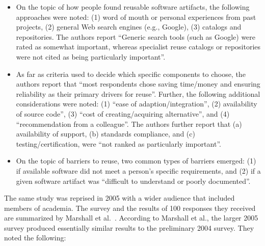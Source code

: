 \documentclass{casicswhitepaper}
\begin{document}
\begin{itemize}

\item On the topic of how people found reusable software artifacts, the following approaches were noted: (1) word of mouth or personal experiences from past projects, (2) general Web search engines (e.g., Google), (3) catalogs and repositories.  The authors report ``Generic search tools (such as Google) were rated as somewhat important, whereas specialist reuse catalogs or repositories were not cited as being particularly important''.

\item As far as criteria used to decide which specific components to choose, the authors report that ``most respondents chose saving time/money and ensuring reliability as their primary drivers for reuse''.  Further, the following additional considerations were noted: (1) ``ease of adaption/integration'', (2) availability of source code'', (3) ``cost of creating/acquiring alternative'', and (4) ``recommendation from a colleague''.  The authors further report that (a) availability of support, (b) standards compliance, and (c) testing/certification, were ``not ranked as particularly important''.

\item On the topic of barriers to reuse, two common types of barriers emerged: (1) if available software did not meet a person's specific requirements, and (2) if a given software artifact was ``difficult to understand or poorly documented''.

\end{itemize}

The same study was reprised in 2005 with a wider audience that included members of academia.  The survey and the results of 100 responses they received are summarized by Marshall et al.~\cite{marshall2006software}.  According to Marshall et al., the larger 2005 survey produced essentially similar results to the preliminary 2004 survey.  They noted the following:
\end{document}
